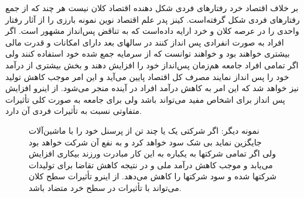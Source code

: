 \documentclass{book}
\begin{document}
بر خلاف اقتصاد خرد رفتارهای فردی شکل دهنده اقتصاد کلان نیست هر چند که از جمع رفتارهای فردی شکل گرفته‌است. کینز پدر علم اقتصاد نوین نمونه بارزی را از آثار رفتار واحدی را در عرصه کلان و خرد ارایه داده‌است که به تناقض پس‌انداز مشهور است. اگر افراد به صورت انفرادی پس انداز کنند در سالهای بعد دارای امکانات و قدرت مالی بیشتری خواهند بود و خواهند توانست که از سرمایه جمع شده خود استفاده کنند ولی اگر تمامی افراد جامعه هم‌زمان پس‌انداز خود را افزایش دهند و بخش بیشتری از درآمد خود را پس انداز نمایند مصرف کل اقتصاد پایین می‌آید و این امر موجب کاهش تولید نیز خواهد شد که این امر به کاهش درآمد افراد در آینده منجر می‌شود. از اینرو افزایش پس انداز برای اشخاص مفید می‌تواند باشد ولی برای جامعه به صورت کلی تأثیرات متفاوتی نسبت به تأثیرات فردی آن دارد.

\begin{figure}
\centering
{}
\caption{نمونه دیگر: اگر شرکتی یک یا چند تن از پرسنل خود را با ماشین‌آلات جایگزین نماید بی شک سود خواهد کرد و به نفع آن شرکت خواهد بود ولی اگر تمامی شرکتها به یکباره به این کار مبادرت ورزند بیکاری افزایش می‌یابد و موجب کاهش درآمد ملی و در نتیجه کاهش تقاضا برای تولیدات شرکتها شده و سود شرکتها را کاهش می‌دهد. از اینرو تأثیرات سطح کلان می‌تواند با تأثیرات در سطح خرد متضاد باشد.}
\end{figure}
\end{document}
